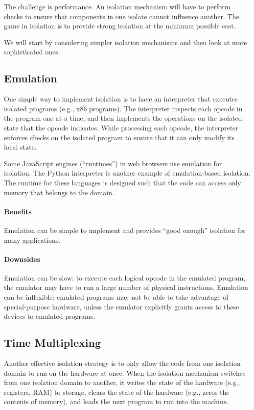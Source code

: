 The challenge is performance.
An isolation mechanism will have to perform checks to
ensure that components in one isolate cannot influence
another.
The game in isolation is to provide strong isolation 
at the minimum possible cost.

We will start by considering simpler isolation mechanisms
and then look at more sophisticated ones.

\subsection{Emulation}

One simple way to implement isolation is to have
an interpreter that executes isolated programs
(e.g., x86 programs).
The interpreter inspects each opcode in the program
one at a time, and then implements the operations
on the isolated state that the opcode indicates.
While processing each opcode, the interpreter
enforces checks on the isolated program to 
ensure that it can only modify its local state.

Some JavaScript engines (``runtimes'') in web browsers use emulation
for isolation. 
The Python interpreter is another example of emulation-based isolation.
The runtime for these languages is
designed such that the code can access only memory
that belongs to the domain.

\paragraph{Benefits}
Emulation can be simple to implement and provides ``good enough''
isolation for many applications.

\paragraph{Downsides}
Emulation can be slow: to execute each logical opcode in the
emulated program, the emulator may have to run a large
number of physical instructions.
Emulation can be inflexible: 
emulated programs may not be able to take advantage
of special-purpose hardware, unless the emulator
explicitly grants access to these devices to emulated
programs.


\subsection{Time Multiplexing}

Another effective isolation strategy is
to only allow the code from one isolation
domain to run on the hardware at once.
When the isolation mechanism switches from 
one isolation domain to another, it writes
the state of the hardware (e.g., registers, RAM)
to storage, clears the state of the hardware
(e.g., zeros the contents of memory), and 
loads the next program to run into the machine.

